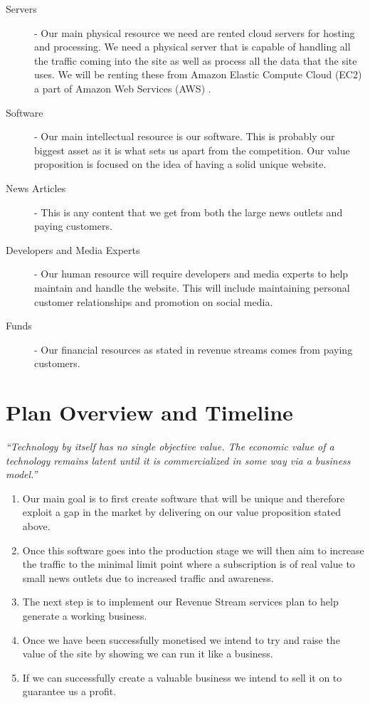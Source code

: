 \documentclass[11pt]{article}
\begin{document}
\begin{description}
\item[Servers] - Our main physical resource we need are rented cloud servers for hosting and processing. We need a physical server that is capable of handling all the traffic coming into the site as well as process all the data that the site uses. We will be renting these from Amazon Elastic Compute Cloud (EC2) a part of Amazon Web Services (AWS) \cite{amazon_aws}.
\item[Software] - Our main intellectual resource is our software. This is probably our biggest asset as it is what sets us apart from the competition. Our value proposition is focused on the idea of having a solid unique website.
\item[News Articles] - This is any content that we get from both the large news outlets and paying customers. 
\item[Developers and Media Experts] - Our human resource will require developers and media experts to help maintain and handle the website. This will include maintaining personal customer relationships and promotion on social media. 
\item[Funds] - Our financial resources as stated in revenue streams comes from paying customers. 
\end{description}


\section{Plan Overview and Timeline}

\begin{center}
\emph{``Technology by itself has no single objective value. The economic value of a technology remains latent until it is commercialized in some way via a business model.''}\cite{chesbrough2010business}
\end{center}

\begin{enumerate}
\item Our main goal is to first create software that will be unique and therefore exploit a gap in the market by delivering on our value proposition stated above. 

\item Once this software goes into the production stage we will then aim to increase the traffic to the minimal limit point where a subscription is of real value to small 
news outlets due to increased traffic and awareness. 

\item The next step is to implement our Revenue Stream services plan to help generate a working business.

\item Once we have been successfully monetised we intend to try and raise the value of the site by showing we can run it like a business.

\item If we can successfully create a valuable business we intend to sell it on to guarantee us a profit.
\end{enumerate}



\end{document}
